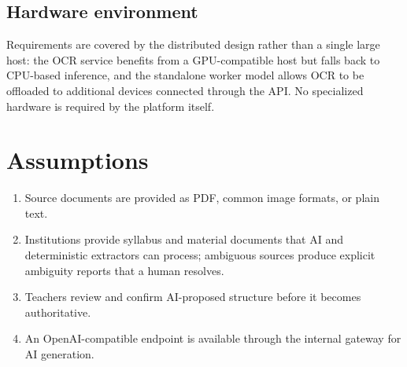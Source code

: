 \subsection{Hardware environment}

Requirements are covered by the distributed design rather than a single
large host: the OCR service benefits from a GPU-compatible host but falls
back to CPU-based inference, and the standalone worker model allows OCR to be
offloaded to additional devices connected through the API. No specialized
hardware is required by the platform itself.

\section{Assumptions}

\begin{enumerate}
  \item Source documents are provided as PDF, common image formats, or plain
        text.
  \item Institutions provide syllabus and material documents that AI and
        deterministic extractors can process; ambiguous sources produce
        explicit ambiguity reports that a human resolves.
  \item Teachers review and confirm AI-proposed structure before it becomes
        authoritative.
  \item An OpenAI-compatible endpoint is available through the internal
        gateway for AI generation.
\end{enumerate}